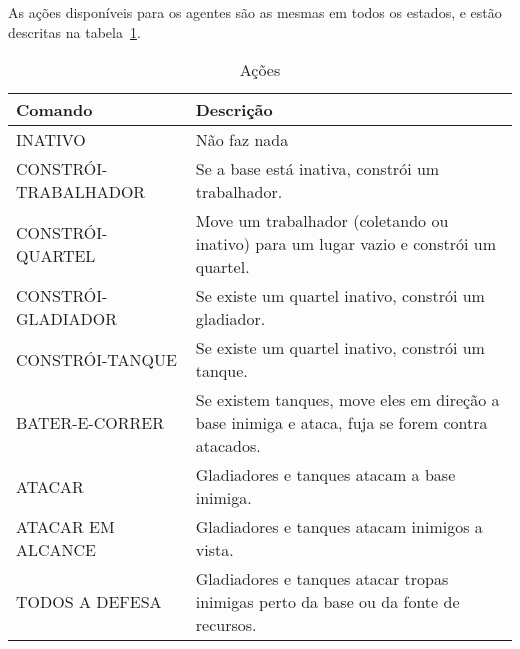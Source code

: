 As ações disponíveis para os agentes são as mesmas em todos os estados, e estão descritas na tabela~\ref{tab:acoes}.

\begin{table}
\begin{center}
\begin{tabular}{|l|p{8cm}|}
    \hline
    Comando              & Descrição                                                                                       \\
    \hline
    INATIVO              & Não faz nada                                                                                    \\
    \hline
    CONSTRÓI-TRABALHADOR & Se a base está inativa, constrói um trabalhador.                                                \\
    \hline
    CONSTRÓI-QUARTEL     & Move um trabalhador (coletando ou inativo) para um lugar vazio e constrói um quartel.           \\
    \hline
    CONSTRÓI-GLADIADOR   & Se existe um quartel inativo, constrói um gladiador.                                            \\
    \hline
    CONSTRÓI-TANQUE      & Se existe um quartel inativo, constrói um tanque.                                               \\
    \hline
    BATER-E-CORRER       & Se existem tanques, move eles em direção a base inimiga e ataca, fuja se forem contra atacados. \\
    \hline
    ATACAR               & Gladiadores e tanques atacam a base inimiga.                                                    \\
    \hline
    ATACAR EM ALCANCE    & Gladiadores e tanques atacam inimigos a vista.                                                  \\
    \hline
    TODOS A DEFESA       & Gladiadores e tanques atacar tropas inimigas perto da base ou da fonte de recursos.             \\
    \hline
\end{tabular}
\end{center}
\caption{Ações}
\label{tab:acoes}
\end{table}
